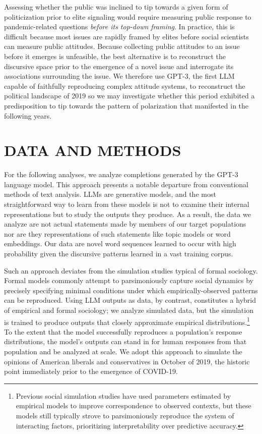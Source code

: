 \documentclass{article} %
\begin{document}
Assessing whether the public was inclined to tip towards a given form of
politicization prior to elite signaling would require measuring public
response to pandemic-related questions \emph{before its top-down
framing}. In practice, this is difficult because most issues are rapidly
framed by elites before social scientists can measure public attitudes.
Because collecting public attitudes to an issue before it emerges is
unfeasible, the best alternative is to reconstruct the discursive space
prior to the emergence of a novel issue and interrogate its associations
surrounding the issue. We therefore use GPT-3, the first LLM capable of
faithfully reproducing complex attitude systems, to reconstruct the
political landscape of 2019 so we may investigate whether this period
exhibited a predisposition to tip towards the pattern of polarization
that manifested in the following years.

\section*{DATA AND METHODS}

For the following analyses, we analyze completions generated by the
GPT-3 language model. This approach presents a notable departure from
conventional methods of text analysis. LLMs are generative models, and
the most straightforward way to learn from these models is not to
examine their internal representations but to study the outputs they
produce. As a result, the data we analyze are not actual statements made
by members of our target populations nor are they representations of
such statements like topic models or word embeddings. Our data are novel
word sequences learned to occur with high probability given the
discursive patterns learned in a vast training corpus.

Such an approach deviates from the simulation studies typical of formal
sociology. Formal models commonly attempt to parsimoniously capture
social dynamics by precisely specifying minimal conditions under which
empirically-observed patterns can be reproduced. Using LLM outputs as
data, by contrast, constitutes a hybrid of empirical and formal
sociology; we analyze simulated data, but the simulation is trained to
produce outputs that closely approximate empirical
distributions.\footnote{Previous social simulation studies have used
  parameters estimated by empirical models to improve correspondence to
  observed contexts, but these models still typically strove to
  parsimoniously reproduce the system of interacting factors,
  prioritizing interpretability over predictive accuracy.} To the extent
that the model successfully reproduces a population's response
distributions, the model's outputs can stand in for human responses from
that population and be analyzed at scale. We adopt this approach to
simulate the opinions of American liberals and conservatives in October
of 2019, the historic point immediately prior to the emergence of
COVID-19.
\end{document}
